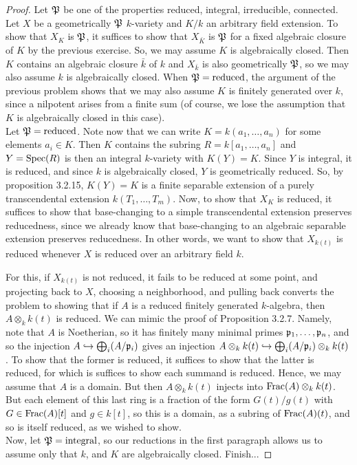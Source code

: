 \begin{proof}
	Let $\mathfrak{P}$ be one of the properties reduced, integral, irreducible, connected. Let $X$ be a geometrically $\mathfrak{P}$ $k$-variety and $K/k$ an arbitrary field extension. To show that $X_K$ is $\mathfrak{P}$, it suffices to show that $X_{\bar{K}}$ is $\mathfrak{P}$ for a fixed algebraic closure of $K$ by the previous exercise. So, we may assume $K$ is algebraically closed. Then $K$ contains an algebraic closure $\bar{k}$ of $k$ and $X_{\bar{k}}$ is also geometrically $\mathfrak{P}$, so we may also assume $k$ is algebraically closed. When $\mathfrak{P} = \text{reduced}$, the argument of the previous problem shows that we may also assume $K$ is finitely generated over $k$, since a nilpotent arises from a finite sum (of course, we lose the assumption that $K$ is algebraically closed in this case). \\
	
	Let $\mathfrak{P} = \text{reduced}$. Note now that we can write $K = k(a_1,\ldots,a_n)$ for some elements $a_i \in K$. Then $K$ contains the subring $R = k[a_1,\ldots,a_n]$ and $Y = \operatorname{Spec}(R)$ is then an integral $k$-variety with $K(Y) = K$. Since $Y$ is integral, it is reduced, and since $k$ is algebraically closed, $Y$ is geometrically reduced. So, by proposition 3.2.15, $K(Y) = K$ is a finite separable extension of a purely transcendental extension $k(T_1,\ldots,T_m)$. Now, to show that $X_K$ is reduced, it suffices to show that base-changing to a simple transcendental extension preserves reducedness, since we already know that base-changing to an algebraic separable extension preserves reducedness. In other words, we want to show that $X_{k(t)}$ is reduced whenever $X$ is reduced over an arbitrary field $k$.
	
	For this, if $X_{k(t)}$ is not reduced, it fails to be reduced at some point, and projecting back to $X$, choosing a neighborhood, and pulling back converts the problem to showing that if $A$ is a reduced finitely generated $k$-algebra, then $A \otimes_k k(t)$ is reduced. We can mimic the proof of Proposition 3.2.7. Namely, note that $A$ is Noetherian, so it has finitely many minimal primes $\mathfrak{p}_1,\ldots,\mathfrak{p}_n$, and so the injection $A \hookrightarrow \bigoplus_i (A/\mathfrak{p}_i)$ gives an injection $A \otimes_k k(t) \hookrightarrow \bigoplus_i (A/\mathfrak{p}_i) \otimes_k k(t)$. To show that the former is reduced, it suffices to show that the latter is reduced, for which is suffices to show each summand is reduced. Hence, we may assume that $A$ is a domain. But then $A \otimes_k k(t)$ injects into $\operatorname{Frac}(A) \otimes_k k(t)$. But each element of this last ring is a fraction of the form $G(t)/g(t)$ with $G \in \operatorname{Frac}(A)[t]$ and $g \in k[t]$, so this is a domain, as a subring of $\operatorname{Frac}(A)(t)$, and so is itself reduced, as we wished to show. \\
	
	Now, let $\mathfrak{P} = \text{integral}$, so our reductions in the first paragraph allows us to assume only that $k$, and $K$ are algebraically closed. Finish...
\end{proof}
